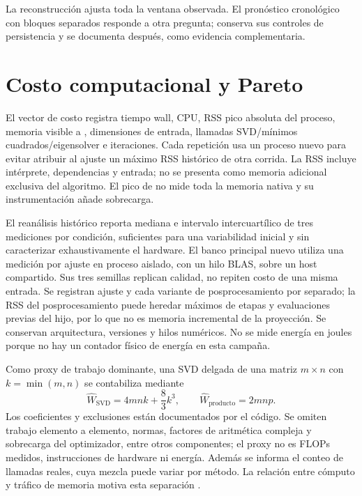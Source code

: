 \documentclass[11pt,oneside,openany]{book}
\newcommand{\code}[1]{\texttt{\detokenize{#1}}}
\begin{document}
La reconstrucción ajusta toda la ventana observada. El pronóstico cronológico
con bloques separados responde a otra pregunta; conserva sus controles de
persistencia y se documenta después, como evidencia complementaria.

\section{Costo computacional y Pareto}
El vector de costo registra tiempo wall, CPU, RSS pico absoluta del
proceso, memoria visible a \code{tracemalloc}, dimensiones de entrada,
llamadas SVD/mínimos cuadrados/eigensolver e iteraciones. Cada repetición
usa un proceso nuevo para evitar atribuir al ajuste un máximo RSS
histórico de otra corrida. La RSS incluye intérprete, dependencias y
entrada; no se presenta como memoria adicional exclusiva del algoritmo.
El pico de \code{tracemalloc} no mide toda la memoria nativa y su
instrumentación añade sobrecarga.

El reanálisis histórico reporta mediana e intervalo intercuartílico de tres
mediciones por condición, suficientes para una variabilidad inicial y sin
caracterizar exhaustivamente el hardware. El banco principal nuevo utiliza
una medición por ajuste en proceso aislado, con un hilo BLAS, sobre un host
compartido. Sus tres semillas replican calidad, no repiten costo de una misma
entrada. Se registran ajuste y cada variante de posprocesamiento por separado;
la RSS del posprocesamiento puede heredar máximos de etapas y evaluaciones
previas del hijo, por lo que no es memoria incremental de la proyección.
Se conservan arquitectura, versiones y hilos numéricos. No se mide energía
en joules porque no hay un contador físico de energía en esta campaña.

Como proxy de trabajo dominante, una SVD delgada de una matriz $m\times n$
con $k=\min(m,n)$ se contabiliza mediante
\begin{equation}
 \widehat W_{\mathrm{SVD}}=4mnk+\frac83k^3,
 \qquad \widehat W_{\mathrm{producto}}=2mnp.
\end{equation}
Los coeficientes y exclusiones están documentados por el código. Se
omiten trabajo elemento a elemento, normas, factores de aritmética
compleja y sobrecarga del optimizador, entre otros componentes; el proxy
no es FLOPs medidos, instrucciones de hardware ni energía. Además se
informa el conteo de llamadas reales, cuya mezcla puede variar por método.
La relación entre cómputo y tráfico de memoria motiva esta separación
\citep{williams2009roofline}.
\end{document}
